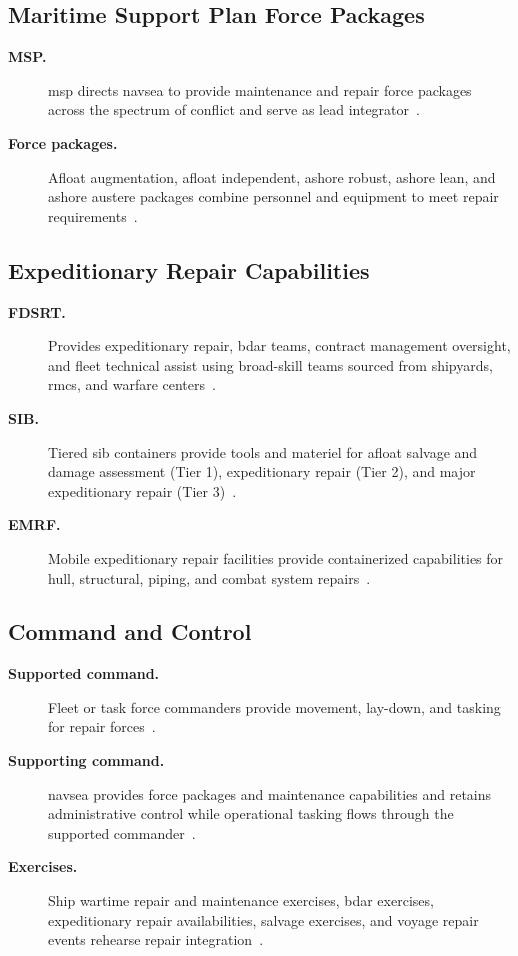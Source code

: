 \documentclass[../main.tex]{subfiles}
\begin{document}
\subsection{Maritime Support Plan Force Packages}
\begin{description}
  \item[\textbf{MSP.}] \ac{msp} directs \ac{navsea} to provide maintenance and repair force packages across the spectrum of conflict and serve as lead integrator~\autocite{edo-4-1-6-bdar-2025}.
  \item[\textbf{Force packages.}] Afloat augmentation, afloat independent, ashore robust, ashore lean, and ashore austere packages combine personnel and equipment to meet repair requirements~\autocite{edo-4-1-6-bdar-2025}.
\end{description}

\subsection{Expeditionary Repair Capabilities}
\begin{description}
  \item[\textbf{FDSRT.}] Provides expeditionary repair, \ac{bdar} teams, contract management oversight, and fleet technical assist using broad-skill teams sourced from shipyards, \acp{rmc}, and warfare centers~\autocite{edo-4-1-6-bdar-2025}.
  \item[\textbf{SIB.}] Tiered \ac{sib} containers provide tools and materiel for afloat salvage and damage assessment (Tier 1), expeditionary repair (Tier 2), and major expeditionary repair (Tier 3)~\autocite{edo-4-1-6-bdar-2025}.
  \item[\textbf{EMRF.}] Mobile expeditionary repair facilities provide containerized capabilities for hull, structural, piping, and combat system repairs~\autocite{edo-4-1-6-bdar-2025}.
\end{description}

\subsection{Command and Control}
\begin{description}
  \item[\textbf{Supported command.}] Fleet or task force commanders provide movement, lay-down, and tasking for repair forces~\autocite{edo-4-1-6-bdar-2025}.
  \item[\textbf{Supporting command.}] \ac{navsea} provides force packages and maintenance capabilities and retains administrative control while operational tasking flows through the supported commander~\autocite{edo-4-1-6-bdar-2025}.
  \item[\textbf{Exercises.}] Ship wartime repair and maintenance exercises, \ac{bdar} exercises, expeditionary repair availabilities, salvage exercises, and voyage repair events rehearse repair integration~\autocite{edo-4-1-6-bdar-2025}.
\end{description}
\end{document}
